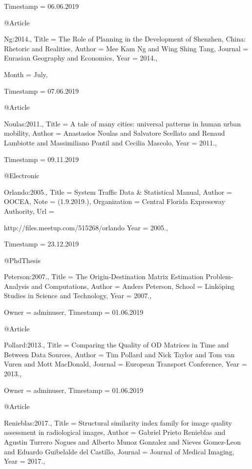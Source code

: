 {{{  Timestamp                = {06.06.2019}
}

@Article{Ng:2014.,
  Title                    = {{The Role of Planning in the Development of Shenzhen, China: Rhetoric and Realities}},
  Author                   = {Mee Kam Ng and Wing Shing Tang},
  Journal                  = {Eurasian Geography and Economics},
  Year                     = {2014.},

  Month                    = {July},

  Timestamp                = {07.06.2019}
}

@Article{Noulas:2011.,
  Title                    = {A tale of many cities: universal patterns in human urban mobility},
  Author                   = {Anastasios Noulas and Salvatore Scellato and Renaud Lambiotte and Massimiliano Pontil and Cecilia Mascolo},
  Year                     = {2011.},

  Timestamp                = {09.11.2019}
}

@Electronic{Orlando:2005.,
  Title                    = {{System Traffic Data \& Statistical Manual}},
  Author                   = {{OOCEA}},
  Note                     = {(1.9.2019.)},
  Organization             = {Central Florida Expressway Authority},
  Url                      = {http://files.meetup.com/515268/orlando%
  Year                     = {2005.},

  Timestamp                = {23.12.2019}
}

@PhdThesis{Peterson:2007.,
  Title                    = {{The Origin-Destination Matrix Estimation Problem- Analysis and Computations}},
  Author                   = {Anders Peterson},
  School                   = {Link\"oping Studies in Science and Technology},
  Year                     = {2007.},

  Owner                    = {adminuser},
  Timestamp                = {01.06.2019}
}

@Article{Pollard:2013.,
  Title                    = {{Comparing the Quality of OD Matrices in Time and Between Data Sources}},
  Author                   = {Tim Pollard and Nick Taylor and Tom van Vuren and Mott MacDonald},
  Journal                  = {European Transport Conference},
  Year                     = {2013.},

  Owner                    = {adminuser},
  Timestamp                = {01.06.2019}
}

@Article{Renieblas:2017.,
  Title                    = {Structural similarity index family for image quality assessment in radiological images},
  Author                   = {Gabriel Prieto Renieblas and Agustin Turrero Nogues and Alberto Munoz Gonzalez and Nieves Gomez-Leon and Eduardo Guibelalde del Castillo},
  Journal                  = {{Journal of Medical Imaging}},
  Year                     = {2017.},

}}}}
